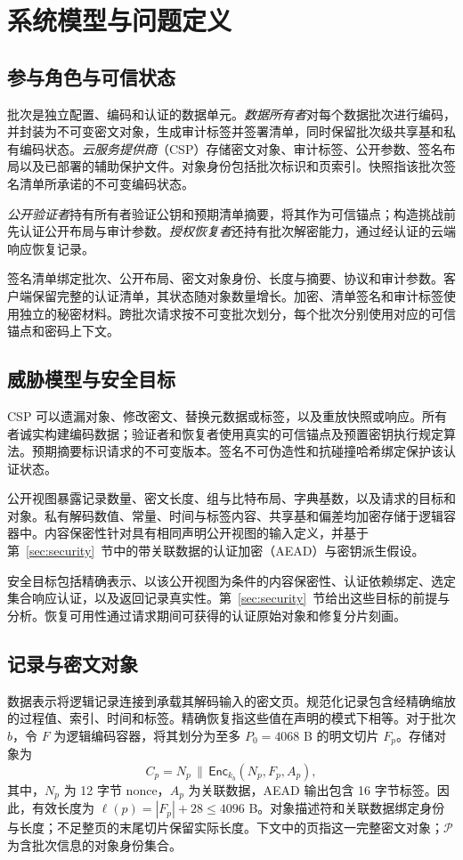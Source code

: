 \documentclass[10pt,journal]{IEEEtran}
\begin{document}
\section{系统模型与问题定义}\label{sec:model}
\subsection{参与角色与可信状态}
批次是独立配置、编码和认证的数据单元。\emph{数据所有者}对每个数据批次进行编码，并封装为不可变密文对象，生成审计标签并签署清单，同时保留批次级共享基和私有编码状态。\emph{云服务提供商}（CSP）存储密文对象、审计标签、公开参数、签名布局以及已部署的辅助保护文件。对象身份包括批次标识和页索引。快照指该批次签名清单所承诺的不可变编码状态。

\emph{公开验证者}持有所有者验证公钥和预期清单摘要，将其作为可信锚点；构造挑战前先认证公开布局与审计参数。\emph{授权恢复者}还持有批次解密能力，通过经认证的云端响应恢复记录。

签名清单绑定批次、公开布局、密文对象身份、长度与摘要、协议和审计参数。客户端保留完整的认证清单，其状态随对象数量增长。加密、清单签名和审计标签使用独立的秘密材料。跨批次请求按不可变批次划分，每个批次分别使用对应的可信锚点和密码上下文。

\subsection{威胁模型与安全目标}
CSP 可以遗漏对象、修改密文、替换元数据或标签，以及重放快照或响应。所有者诚实构建编码数据；验证者和恢复者使用真实的可信锚点及预置密钥执行规定算法。预期摘要标识请求的不可变版本。签名不可伪造性和抗碰撞哈希绑定保护该认证状态。

公开视图暴露记录数量、密文长度、组与比特布局、字典基数，以及请求的目标和对象。私有解码数值、常量、时间与标签内容、共享基和偏差均加密存储于逻辑容器中。内容保密性针对具有相同声明公开视图的输入定义，并基于第~\ref{sec:security}~节中的带关联数据的认证加密（AEAD）与密钥派生假设。

安全目标包括精确表示、以该公开视图为条件的内容保密性、认证依赖绑定、选定集合响应认证，以及返回记录真实性。第~\ref{sec:security}~节给出这些目标的前提与分析。恢复可用性通过请求期间可获得的认证原始对象和修复分片刻画。

\subsection{记录与密文对象}
数据表示将逻辑记录连接到承载其解码输入的密文页。规范化记录包含经精确缩放的过程值、索引、时间和标签。精确恢复指这些值在声明的模式下相等。对于批次 $b$，令 $F$ 为逻辑编码容器，将其划分为至多 $P_0=4068$ B 的明文切片 $F_p$。存储对象为
\begin{equation}\label{eq:cipher}
C_p=N_p\,\|\,\mathsf{Enc}_{k_b}(N_p,F_p,A_p),
\end{equation}
其中，$N_p$ 为 12 字节 nonce，$A_p$ 为关联数据，AEAD 输出包含 16 字节标签。因此，有效长度为 $\ell(p)=|F_p|+28\leq4096$ B。对象描述符和关联数据绑定身份与长度；不足整页的末尾切片保留实际长度。下文中的页指这一完整密文对象；$\mathcal P$ 为含批次信息的对象身份集合。
\end{document}
